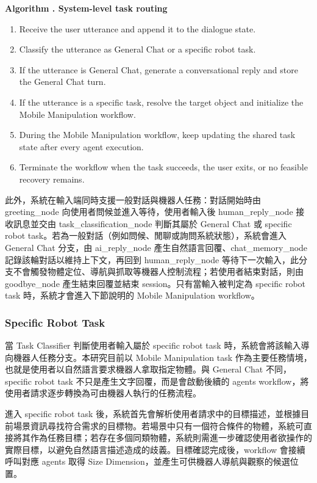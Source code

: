 \documentclass[12pt,a4paper]{article}
\newcounter{algorithmblock}
\newenvironment{algorithmblock}[1]{%
  \refstepcounter{algorithmblock}
  \vspace{0.6em}
  \noindent\begin{minipage}{\linewidth}
  \textbf{Algorithm \thealgorithmblock. #1}
  \begin{enumerate}[label=\arabic*.,leftmargin=2em]
}{%
  \end{enumerate}
  \end{minipage}
  \vspace{0.6em}
}
\begin{document}
\begin{algorithmblock}{System-level task routing}
\item Receive the user utterance and append it to the dialogue state.
\item Classify the utterance as General Chat or a specific robot task.
\item If the utterance is General Chat, generate a conversational reply and store the General Chat turn.
\item If the utterance is a specific task, resolve the target object and initialize the Mobile Manipulation workflow.
\item During the Mobile Manipulation workflow, keep updating the shared task state after every agent execution.
\item Terminate the workflow when the task succeeds, the user exits, or no feasible recovery remains.
\end{algorithmblock}

此外，系統在輸入端同時支援一般對話與機器人任務：對話開始時由 greeting\_node 向使用者問候並進入等待，使用者輸入後 human\_reply\_node 接收訊息並交由 task\_classification\_node 判斷其屬於 General Chat 或 specific robot task。若為一般對話（例如問候、閒聊或詢問系統狀態），系統會進入 General Chat 分支，由 ai\_reply\_node 產生自然語言回覆、chat\_memory\_node 記錄該輪對話以維持上下文，再回到 human\_reply\_node 等待下一次輸入，此分支不會觸發物體定位、導航與抓取等機器人控制流程；若使用者結束對話，則由 goodbye\_node 產生結束回覆並結束 session。只有當輸入被判定為 specific robot task 時，系統才會進入下節說明的 Mobile Manipulation workflow。

\subsubsection{Specific Robot Task}

當 Task Classifier 判斷使用者輸入屬於 specific robot task 時，系統會將該輸入導向機器人任務分支。本研究目前以 Mobile Manipulation task 作為主要任務情境，也就是使用者以自然語言要求機器人拿取指定物體。與 General Chat 不同，specific robot task 不只是產生文字回覆，而是會啟動後續的 agents workflow，將使用者請求逐步轉換為可由機器人執行的任務流程。

進入 specific robot task 後，系統首先會解析使用者請求中的目標描述，並根據目前場景資訊尋找符合需求的目標物。若場景中只有一個符合條件的物體，系統可直接將其作為任務目標；若存在多個同類物體，系統則需進一步確認使用者欲操作的實際目標，以避免自然語言描述造成的歧義。目標確認完成後，workflow 會接續呼叫對應 agents 取得 Size Dimension，並產生可供機器人導航與觀察的候選位置。
\end{document}
